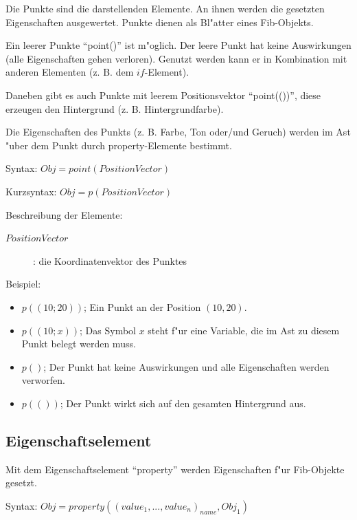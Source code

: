 \begin{flushleft}
Die Punkte sind die darstellenden Elemente. An ihnen werden die gesetzten Eigenschaften ausgewertet. Punkte dienen als Bl"atter eines Fib-Objekts.

Ein leerer Punkte ``point()'' ist m"oglich. Der leere Punkt hat keine Auswirkungen (alle Eigenschaften gehen verloren). Genutzt werden kann er in Kombination mit anderen Elementen (z. B. dem $if$-Element).

Daneben gibt es auch Punkte mit leerem Positionsvektor ``point(())'', diese erzeugen den Hintergrund (z. B. Hintergrundfarbe).

Die Eigenschaften des Punkts (z. B. Farbe, Ton oder/und Geruch) werden im Ast "uber dem Punkt durch property-Elemente bestimmt.

\bigskip\noindent
Syntax:
$Obj = point( PositionVector )$

\bigskip\noindent
Kurzsyntax:
$Obj = p( PositionVector )$

\bigskip\noindent
Beschreibung der Elemente:
\begin{description}
 \item[$PositionVector$]: die Koordinatenvektor des Punktes
\end{description}

\bigskip\noindent
Beispiel:
\begin{itemize}
 \item $p((10;20))$; Ein Punkt an der Position $(10, 20)$.
 \item $p((10;x))$; Das Symbol $x$ steht f"ur eine Variable, die im Ast zu diesem Punkt belegt werden muss.
 \item $p()$; Der Punkt hat keine Auswirkungen und alle Eigenschaften werden verworfen.
 \item $p(())$; Der Punkt wirkt sich auf den gesamten Hintergrund aus.
\end{itemize}

\end{flushleft}



\subsection{Eigenschaftselement}
\label{fibProperty}\label{secFibProperty}

Mit dem Eigenschaftselement ``property'' werden Eigenschaften f"ur Fib-Objekte gesetzt.

\bigskip\noindent
Syntax:
$Obj = property( ( value_1, ..., value_n)_{name}, Obj_1 ) $

